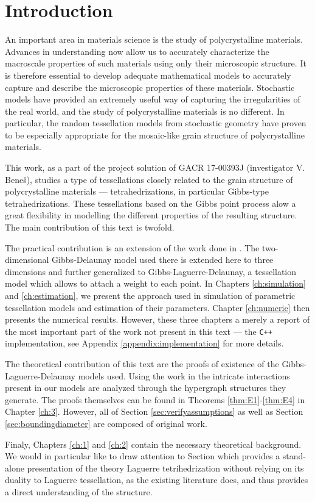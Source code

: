 \chapter*{Introduction}

An important area in materials science is the study of polycrystalline materials. Advances in understanding now allow us to accurately characterize the macroscale properties of such materials using only their microscopic structure. It is therefore essential to develop adequate mathematical models to accurately capture and describe the microscopic properties of these materials.
Stochastic models have provided an extremely useful way of capturing the irregularities of the real world, and the study of polycrystalline materials is no different. In particular, the random tessellation models from stochastic geometry have proven to be especially appropriate for the mosaic-like grain structure of polycrystalline materials. 

This work, as a part of the project solution of GACR 17-00393J (investigator V. Bene\v{s}), studies a type of tessellations closely related to the grain structure of polycrystalline materials --- tetrahedrizations, in particular Gibbs-type tetrahedrizations. These tessellations based on the Gibbs point process alow a great flexibility in modelling the different properties of the resulting structure. 
The main contribution of this text is twofold. 

The practical contribution is an extension of the work done in \cite{DereudreLavancier2011}. The two-dimensional Gibbs-Delaunay model used there is extended here to three dimensions and further generalized to Gibbs-Laguerre-Delaunay, a tessellation model which allows to attach a weight to each point. In Chapters \ref{ch:simulation} and \ref{ch:estimation}, we present the approach used in simulation of parametric tessellation models and estimation of their parameters. Chapter \ref{ch:numeric} then presents the numerical results. However, these three chapters a merely a report of the most important part of the work not present in this text --- the \texttt{C++} implementation, see Appendix \ref{appendix:implementation} for more details. 

The theoretical contribution of this text are the proofs of existence of the Gibbs-Laguerre-Delaunay models used. Using the work in \cite{DDG12} the intricate interactions present in our models are analyzed through the hypergraph structures they generate. The proofs themselves can be found in Theorems \ref{thm:E1}-\ref{thm:E4} in Chapter \ref{ch:3}. However, all of Section \ref{sec:verifyassumptions} as well as Section \ref{sec:boundingdiameter} are composed of original work. 

Finaly, Chapters \ref{ch:1} and \ref{ch:2} contain the necessary theoretical background. We would in particular like to draw attention to Section \label{sec:Laguerre} which provides a stand-alone presentation of the theory Laguerre tetrihedrization without relying on its duality to Laguerre tessellation, as the existing literature does, and thus provides a direct understanding of the structure. 

